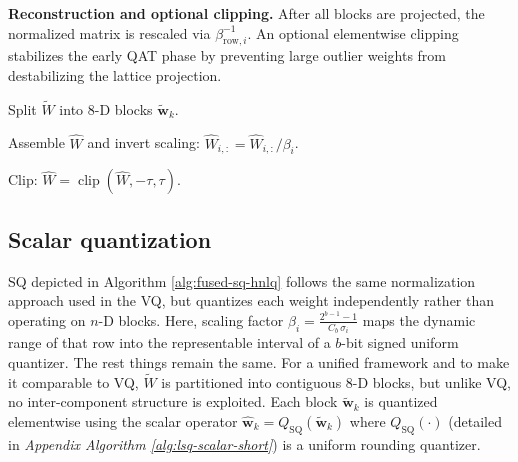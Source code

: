 \documentclass{article}
\theoremstyle{definition}
\theoremstyle{remark}
\begin{document}
\noindent \textbf{Reconstruction and optional clipping.}
After all blocks are projected, the normalized matrix is rescaled via $\beta_{\mathrm{row},i}^{-1}$. An optional elementwise clipping stabilizes the early QAT phase by preventing large outlier weights from destabilizing the lattice projection.


\begin{algorithm}[H]
\caption{Fused E8 vector quantization}
\label{alg:fused-e8-hnlq}
\scriptsize
\DontPrintSemicolon
{}


Split $\widetilde{W}$ into 8-D blocks $\widetilde{\mathbf{w}}_k$.


Assemble $\widehat{W}$ and invert scaling:
$\widehat{W}_{i,:} = \widehat{W}_{i,:}/\beta_i$.

Clip: $\widehat{W}=\operatorname{clip}(\widehat{W},-\tau,\tau)$.
\end{algorithm}

\subsection{Scalar quantization}
SQ depicted in Algorithm \ref{alg:fused-sq-hnlq} follows the same normalization approach used in the VQ, but quantizes each weight independently rather than operating on $n$-D blocks. Here, scaling factor $\beta_i = \frac{2^{b-1}-1}{C_b \,\sigma_i}$ maps the dynamic range of that row into the representable interval of a $b$-bit signed uniform quantizer. The rest things remain the same. For a unified framework and to make it comparable to VQ, $\widetilde{W}$ is partitioned into contiguous 8-D blocks, but unlike VQ, no inter-component structure is exploited. Each block $\widetilde{\mathbf{w}}_k$ is quantized elementwise using the scalar operator $\widehat{\mathbf{w}}_k = Q_{\mathrm{SQ}}(\widetilde{\mathbf{w}}_k)$ where $Q_{\mathrm{SQ}}(\cdot)$ (detailed in \textit{Appendix Algorithm \ref{alg:lsq-scalar-short}}) is a uniform rounding quantizer. 

\end{document}
